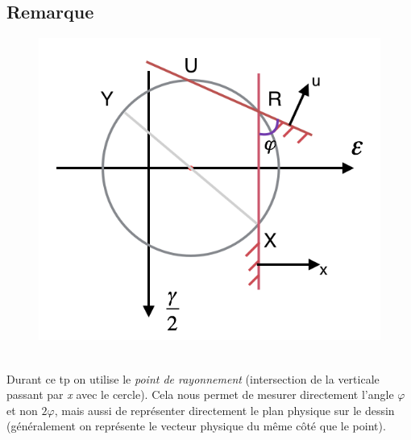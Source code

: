 \subsection*{Remarque}
\begin{figure}
	\includegraphics[scale=0.5]{TP3-2}
\end{figure}
\ \\ Durant ce tp on utilise le \textit{point de rayonnement} (intersection de la verticale passant par \textit{x} avec le cercle). Cela nous permet de mesurer directement l'angle $\varphi$ et non $2 \varphi$, mais aussi de représenter directement le plan physique sur le dessin (généralement on représente le vecteur physique du même côté que le point).\\


